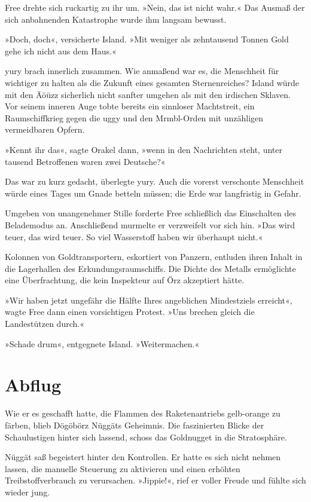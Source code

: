 Free drehte sich ruckartig zu ihr um. »Nein, das ist nicht wahr.« Das Ausmaß der sich anbahnenden Katastrophe wurde ihm langsam bewusst.

»Doch, doch«, versicherte Island. »Mit weniger als zehntausend Tonnen Gold gehe ich nicht aus dem Haus.«

yury brach innerlich zusammen. Wie anmaßend war es, die Menschheit für wichtiger zu halten als die Zukunft eines gesamten Sternenreiches? Island würde mit den Äöüzz sicherlich nicht sanfter umgehen als mit den irdischen Sklaven. Vor seinem inneren Auge tobte bereits ein sinnloser Machtstreit, ein Raumschiffkrieg gegen die uggy und den Mrmbl-Orden mit unzähligen vermeidbaren Opfern.

»Kennt ihr das«, sagte Orakel dann, »wenn in den Nachrichten steht, unter tausend Betroffenen waren zwei Deutsche?«

Das war zu kurz gedacht, überlegte yury. Auch die vorerst verschonte Menschheit würde eines Tages um Gnade betteln müssen; die Erde war langfristig in Gefahr.

Umgeben von unangenehmer Stille forderte Free schließlich das Einschalten des Belademodus an. Anschließend murmelte er verzweifelt vor sich hin. »Das wird teuer, das wird teuer. So viel Wasserstoff haben wir überhaupt nicht.«

Kolonnen von Goldtransportern, eskortiert von Panzern, entluden ihren Inhalt in die Lagerhallen des Erkundungsraumschiffs. Die Dichte des Metalls ermöglichte eine Überfrachtung, die kein Inspekteur auf Örz akzeptiert hätte.

»Wir haben jetzt ungefähr die Hälfte Ihres angeblichen Mindestziels erreicht«, wagte Free dann einen vorsichtigen Protest. »Uns brechen gleich die Landestützen durch.«

»Schade drum«, entgegnete Island. »Weitermachen.«


\chapter{Abflug}

Wie er es geschafft hatte, die Flammen des Raketenantriebs gelb-orange zu färben, blieb Dögöbörz Nüggäts Geheimnis. Die faszinierten Blicke der Schaulustigen hinter sich lassend, schoss das Goldnugget in die Stratosphäre.

Nüggät saß begeistert hinter den Kontrollen. Er hatte es sich nicht nehmen lassen, die manuelle Steuerung zu aktivieren und einen erhöhten Treibstoffverbrauch zu verursachen. »Jippie!«, rief er voller Freude und fühlte sich wieder jung.


